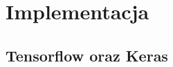 \documentclass[a4paper,12pt]{book} %
\begin{document}
\chapter{Implementacja}
\section{Tensorflow oraz Keras}
\lipsum[1]\cite{doersch2021tutorial}


\listoffigures{} %



\end{document}
